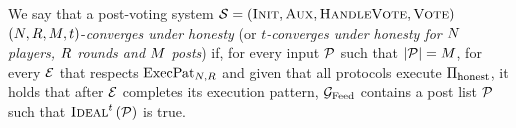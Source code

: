 \begin{definition}
  We say that a post-voting system $\mathcal{S} = \left(\textsc{Init}, \textsc{Aux},
  \textsc{HandleVote}, \textsc{Vote}\right)$ $\left(N, R,
  M, t\right)$-\emph{converges under honesty} (or \emph{$t$-converges
  under honesty for $N$ players, $R$ rounds and $M$
  posts}) if, for every input $\mathcal{P}$ such that $|\mathcal{P}| = M$,
  for every $\mathcal{E}$ that respects $\mathrm{ExecPat}_{N, R}$ and given that
  all protocols execute $\Pi_{\mathrm{honest}}$, it holds that after $\mathcal{E}$ completes its
  execution pattern, $\mathcal{G}_{\mathrm{Feed}}$ contains a post list $\mathcal{P}$ such that
  $\textsc{Ideal}^t\left(\mathcal{P}\right)$ is true.
\end{definition}
